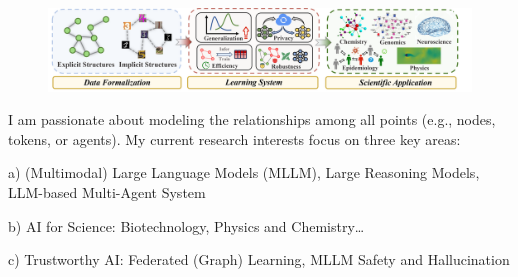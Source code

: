 \begin{figure}[h!]
    \vspace{-10pt}
    \centering
    \begin{center}
    \includegraphics[width=0.99\linewidth]{framework.png}
    \end{center}
    \vspace{-10pt}
    \label{fig: framework}
    \vspace{-10pt}
\end{figure}


I am passionate about modeling the relationships among all points (e.g., nodes, tokens, or agents). My current research interests focus on three key areas:

a) (Multimodal) Large Language Models (MLLM), Large Reasoning Models, LLM-based Multi-Agent System

b) AI for Science: Biotechnology, Physics and Chemistry…

c) Trustworthy AI: Federated (Graph) Learning, MLLM Safety and Hallucination